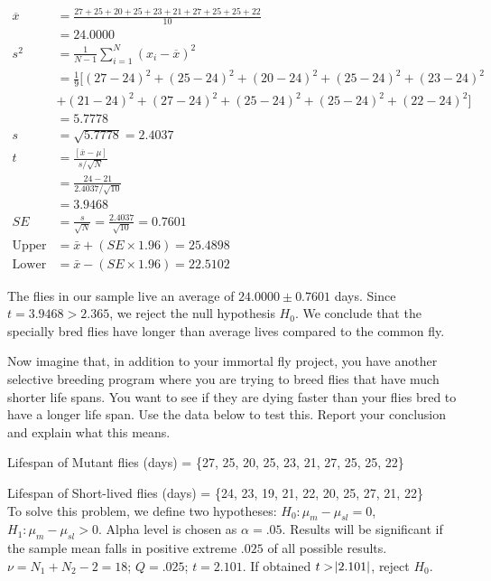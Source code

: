 \documentclass[onecolumn,10pt]{jhwhw}
\begin{document}
\begin{equation*}
\begin{split}
\overline{x} & = \frac{27 + 25 + 20 + 25 + 23 + 21 + 27 + 25 + 25 + 22}{10} \\
             & = 24.0000 \\
s^2 & = \frac{1}{N-1} \sum_{i=1}^N (x_i - \overline{x})^2 \\
    & = \frac{1}{9} [(27-24)^2 + (25-24)^2 + (20-24)^2 + (25-24)^2 + (23-24)^2 \\
    & + (21-24)^2 + (27-24)^2 + (25-24)^2 + (25-24)^2 + (22-24)^2] \\
    & = 5.7778 \\
s & = \sqrt{5.7778} = 2.4037\\
%
t & = \frac{\left[ \overline{x} - \mu \right]}{s/\sqrt{N}} \\
  & = \frac{24 - 21}{2.4037/\sqrt{10}} \\
  & = 3.9468\\
%
SE & = \frac{s}{\sqrt{N}} = \frac{2.4037}{\sqrt{10}} = 0.7601 \\
\text{Upper 95\%} & = \bar{x} + (SE \times 1.96) = 25.4898 \\
\text{Lower 95\%} & = \bar{x} - (SE \times 1.96) = 22.5102
\end{split}
\end{equation*}

The flies in our sample live an average of $24.0000 \pm 0.7601$ days. Since $t = 3.9468 > 2.365$, we reject the null hypothesis $H_0$. We conclude that the specially bred flies have longer than average lives compared to the common fly.

\problem{}
Now imagine that, in addition to your immortal fly project, you have another selective breeding program where you are trying to breed flies that have much shorter life spans. You want to see if they are dying faster than your flies bred to have a longer life span. Use the data below to test this. Report your conclusion and explain what this means.

Lifespan of Mutant flies (days) = \{27, 25, 20, 25, 23, 21, 27, 25, 25, 22\}

Lifespan of Short-lived flies (days) = \{24, 23, 19, 21, 22, 20, 25, 27, 21, 22\} \\

To solve this problem, we define two hypotheses: $H_0: \mu_{m} - \mu_{sl} = 0$, $H_1: \mu_{m} - \mu_{sl} > 0$. Alpha level is chosen as $\alpha = .05$. Results will be significant if the sample mean falls in positive extreme $.025$ of all possible results. $\nu = N_1 + N_2 - 2 = 18$; $Q = .025$; $t = 2.101$. If obtained $t > \abs{2.101}$, reject $H_0$.
\end{document}
